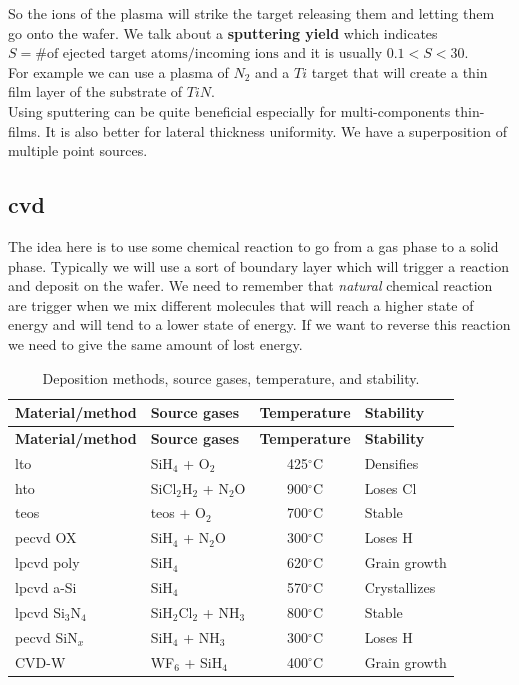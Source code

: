 \documentclass[
]{article}
\begin{document}
So the ions of the plasma will strike the target releasing them and
letting them go onto the wafer. We talk about a \textbf{sputtering
yield} which indicates
\(S = \text{\# of ejected target atoms} / \text{incoming ions}\) and it
is usually \(0.1<S<30\).\\
For example we can use a plasma of \(N_2\) and a \(Ti\) target that will
create a thin film layer of the substrate of \(TiN\).\\
Using sputtering can be quite beneficial especially for multi-components
thin-films. It is also better for lateral thickness uniformity. We have
a superposition of multiple point sources.

\hypertarget{cvd}{%
\subsection{\texorpdfstring{{cvd}}{cvd}}\label{cvd}}

The idea here is to use some chemical reaction to go from a gas phase to
a solid phase. Typically we will use a sort of boundary layer which will
trigger a reaction and deposit on the wafer. We need to remember that
\emph{natural} chemical reaction are trigger when we mix different
molecules that will reach a higher state of energy and will tend to a
lower state of energy. If we want to reverse this reaction we need to
give the same amount of lost energy.

\hypertarget{tab:deposition_methods}{}
\begin{longtable}[]{@{}llcl@{}}
\caption{Deposition methods, source gases, temperature, and
stability.}\tabularnewline
\toprule\noalign{}
\textbf{Material/method} & \textbf{Source gases} & \textbf{Temperature}
& \textbf{Stability} \\
\midrule\noalign{}
\endfirsthead
\toprule\noalign{}
\textbf{Material/method} & \textbf{Source gases} & \textbf{Temperature}
& \textbf{Stability} \\
\midrule\noalign{}
\endhead
\bottomrule\noalign{}
\endlastfoot
{lto} & SiH\(_4\) + O\(_2\) & 425\(^\circ\)C & Densifies \\
{hto} & SiCl\(_2\)H\(_2\) + N\(_2\)O & 900\(^\circ\)C & Loses Cl \\
{teos} & {teos} + O\(_2\) & 700\(^\circ\)C & Stable \\
{pecvd} OX & SiH\(_4\) + N\(_2\)O & 300\(^\circ\)C & Loses H \\
{lpcvd} poly & SiH\(_4\) & 620\(^\circ\)C & Grain growth \\
{lpcvd} a-Si & SiH\(_4\) & 570\(^\circ\)C & Crystallizes \\
{lpcvd} Si\(_3\)N\(_4\) & SiH\(_2\)Cl\(_2\) + NH\(_3\) & 800\(^\circ\)C
& Stable \\
{pecvd} SiN\(_x\) & SiH\(_4\) + NH\(_3\) & 300\(^\circ\)C & Loses H \\
CVD-W & WF\(_6\) + SiH\(_4\) & 400\(^\circ\)C & Grain growth \\
\end{longtable}
\end{document}
